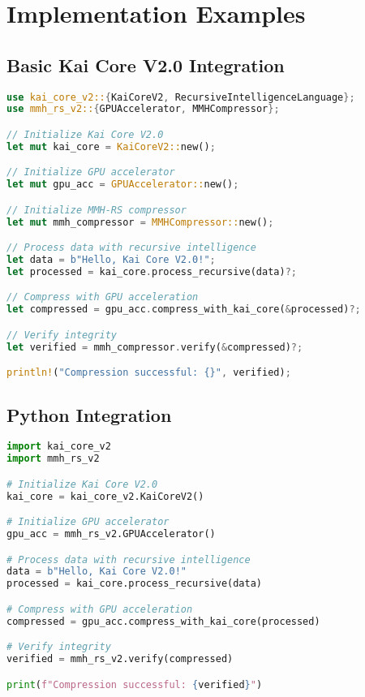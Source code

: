 \documentclass[12pt,a4paper]{article}
\begin{document}
\newpage

\section{Implementation Examples}

\subsection{Basic Kai Core V2.0 Integration}
\begin{lstlisting}[language=Rust, caption=Basic Integration]
use kai_core_v2::{KaiCoreV2, RecursiveIntelligenceLanguage};
use mmh_rs_v2::{GPUAccelerator, MMHCompressor};

// Initialize Kai Core V2.0
let mut kai_core = KaiCoreV2::new();

// Initialize GPU accelerator
let mut gpu_acc = GPUAccelerator::new();

// Initialize MMH-RS compressor
let mut mmh_compressor = MMHCompressor::new();

// Process data with recursive intelligence
let data = b"Hello, Kai Core V2.0!";
let processed = kai_core.process_recursive(data)?;

// Compress with GPU acceleration
let compressed = gpu_acc.compress_with_kai_core(&processed)?;

// Verify integrity
let verified = mmh_compressor.verify(&compressed)?;

println!("Compression successful: {}", verified);
\end{lstlisting}

\subsection{Python Integration}
\begin{lstlisting}[language=Python, caption=Python Integration]
import kai_core_v2
import mmh_rs_v2

# Initialize Kai Core V2.0
kai_core = kai_core_v2.KaiCoreV2()

# Initialize GPU accelerator
gpu_acc = mmh_rs_v2.GPUAccelerator()

# Process data with recursive intelligence
data = b"Hello, Kai Core V2.0!"
processed = kai_core.process_recursive(data)

# Compress with GPU acceleration
compressed = gpu_acc.compress_with_kai_core(processed)

# Verify integrity
verified = mmh_rs_v2.verify(compressed)

print(f"Compression successful: {verified}")
\end{lstlisting}
\end{document}
